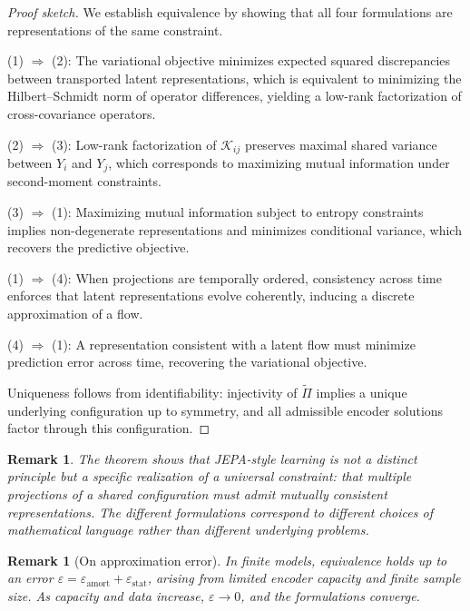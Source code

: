 \documentclass[12pt, oneside]{article}
\newtheorem{remark}[definition]{Remark}
\begin{document}
\begin{proof}[Proof sketch]
We establish equivalence by showing that all four formulations are representations of the same constraint.

(1) $\Rightarrow$ (2): The variational objective minimizes expected squared discrepancies between transported latent representations, which is equivalent to minimizing the Hilbert--Schmidt norm of operator differences, yielding a low-rank factorization of cross-covariance operators.

(2) $\Rightarrow$ (3): Low-rank factorization of $\mathcal{K}_{ij}$ preserves maximal shared variance between $Y_i$ and $Y_j$, which corresponds to maximizing mutual information under second-moment constraints.

(3) $\Rightarrow$ (1): Maximizing mutual information subject to entropy constraints implies non-degenerate representations and minimizes conditional variance, which recovers the predictive objective.

(1) $\Rightarrow$ (4): When projections are temporally ordered, consistency across time enforces that latent representations evolve coherently, inducing a discrete approximation of a flow.

(4) $\Rightarrow$ (1): A representation consistent with a latent flow must minimize prediction error across time, recovering the variational objective.

Uniqueness follows from identifiability: injectivity of $\widetilde{\Pi}$ implies a unique underlying configuration up to symmetry, and all admissible encoder solutions factor through this configuration.
\end{proof}

\begin{remark}
The theorem shows that JEPA-style learning is not a distinct principle but a specific realization of a universal constraint: that multiple projections of a shared configuration must admit mutually consistent representations. The different formulations correspond to different choices of mathematical language rather than different underlying problems.
\end{remark}

\begin{remark}[On approximation error]
In finite models, equivalence holds up to an error $\varepsilon = \varepsilon_{\mathrm{amort}} + \varepsilon_{\mathrm{stat}}$, arising from limited encoder capacity and finite sample size. As capacity and data increase, $\varepsilon \to 0$, and the formulations converge.
\end{remark}
\end{document}
